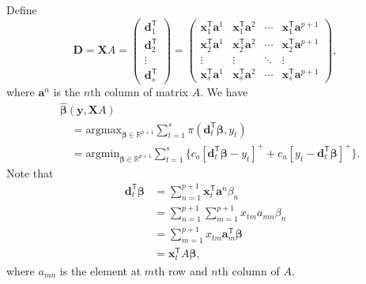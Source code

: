 \documentclass{article}
\begin{document}
Define
    \[
        \mathbf{D}=\mathbf{X}A
        =\begin{pmatrix}
            \mathbf{d}_1^{\mathsf{T}}\\
            \mathbf{d}_2^{\mathsf{T}}\\
            \vdots\\
            \mathbf{d}_s^{\mathsf{T}}
        \end{pmatrix}
        =\begin{pmatrix}
            \mathbf{x}_{1}^{\mathsf{T}}\mathbf{a}^1&\mathbf{x}_1^{\mathsf{T}}\mathbf{a}^2&\cdots &\mathbf{x}_1^{\mathsf{T}}\mathbf{a}^{p+1}\\
            \mathbf{x}_2^{\mathsf{T}}\mathbf{a}^1&\mathbf{x}_2^{\mathsf{T}}\mathbf{a}^2&\cdots &\mathbf{x}_2^{\mathsf{T}}\mathbf{a}^{p+1}\\
            \vdots &\vdots &\ddots &\vdots \\
            \mathbf{x}_s^{\mathsf{T}}\mathbf{a}^1&\mathbf{x}_s^{\mathsf{T}}\mathbf{a}^2&\cdots &\mathbf{x}_s^{\mathsf{T}}\mathbf{a}^{p+1}
        \end{pmatrix},
    \]
    where $\mathbf{a}^n$ is the $n$th column of matrix $A$. We have
    \[
        \begin{aligned}
            &\hat{\boldsymbol{\beta}}(\mathbf{y},\mathbf{X}A)\\
            &\quad=\text{argmax}_{\boldsymbol{\beta}\in \mathbb{R}^{p+1}}\displaystyle\sum_{t=1}^s{\pi(\mathbf{d}_t^{\mathsf{T}}\boldsymbol{\beta},y_t)}\\
            &\quad=\text{argmin}_{\boldsymbol{\beta}\in \mathbb{R}^{p+1}}\displaystyle\sum_{t=1}^s{\{c_o[\mathbf{d}_t^{\mathsf{T}}\boldsymbol{\beta}-y_t]^{+}+c_u[y_t-\mathbf{d}_t^{\mathsf{T}}\boldsymbol{\beta}]^{+}\}}.
        \end{aligned}
    \]
    Note that
    \[
        \begin{aligned}
            \mathbf{d}_t^{\mathsf{T}}\boldsymbol{\beta}
            &=\displaystyle\sum_{n=1}^{p+1}\mathbf{x}_t^{\mathsf{T}}\mathbf{a}^n\beta_n\\
            &=\displaystyle\sum_{n=1}^{p+1}\displaystyle\sum_{m=1}^{p+1}x_{tm}a_{mn}\beta_n\\
            &=\displaystyle\sum_{m=1}^{p+1}x_{tm}\mathbf{a}_m^{\mathsf{T}}\boldsymbol{\beta}\\
            &=\mathbf{x}_t^{\mathsf{T}}A\boldsymbol{\beta},
        \end{aligned}
    \]
    where $a_{mn}$ is the element at $m$th row and $n$th column of $A$.
\end{document}
